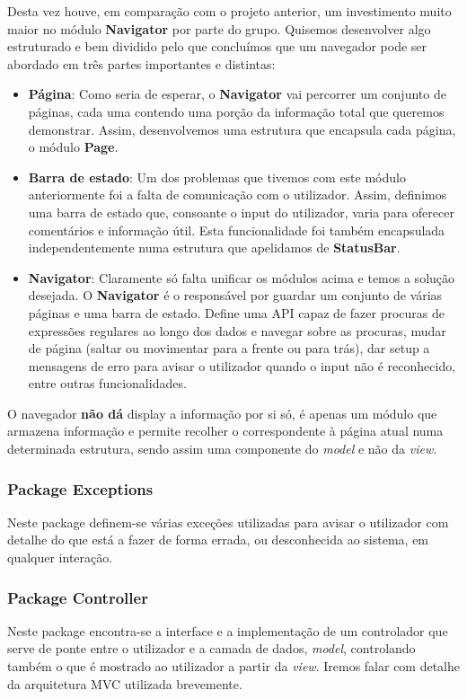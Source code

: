 \documentclass[11pt]{article}
\begin{document}
Desta vez houve, em comparação com o projeto anterior, um investimento muito maior no módulo \textbf{Navigator} por parte do grupo. Quisemos desenvolver algo estruturado e bem dividido pelo que concluímos que um navegador pode ser abordado em três partes importantes e distintas:

\begin{itemize}
    \item \textbf{Página}: Como seria de esperar, o \textbf{Navigator} vai percorrer um conjunto de páginas, cada uma contendo uma porção da informação total que queremos demonstrar. Assim, desenvolvemos uma estrutura que encapsula cada página, o módulo \textbf{Page}.
    \item \textbf{Barra de estado}: Um dos problemas que tivemos com este módulo anteriormente foi a falta de comunicação com o utilizador. Assim, definimos uma barra de estado que, consoante o input do utilizador, varia para oferecer comentários e informação útil. Esta funcionalidade foi também encapsulada independentemente numa estrutura que apelidamos de \textbf{StatusBar}.
    \item \textbf{Navigator}: Claramente só falta unificar os módulos acima e temos a solução desejada. O \textbf{Navigator} é o responsável por guardar um conjunto de várias páginas e uma barra de estado. Define uma API capaz de fazer procuras de expressões regulares ao longo dos dados e navegar sobre as procuras, mudar de página (saltar ou movimentar para a frente ou para trás), dar setup a mensagens de erro para avisar o utilizador quando o input não é reconhecido, entre outras funcionalidades.
\end{itemize}

O navegador \textbf{não dá} display a informação por si só, é apenas um módulo que armazena informação e permite recolher o correspondente à página atual numa determinada estrutura, sendo assim uma componente do \textit{model} e não da \textit{view}.


\newpage
\subsubsection{Package Exceptions}
Neste package definem-se várias exceções utilizadas para avisar o utilizador com detalhe do que está a fazer de forma errada, ou desconhecida ao sistema, em qualquer interação.

\subsubsection{Package Controller}
Neste package encontra-se a interface e a implementação de um controlador que serve de ponte entre o utilizador e a camada de dados, \textit{model}, controlando também o que é mostrado ao utilizador a partir da \textit{view}. Iremos falar com detalhe da arquitetura MVC utilizada brevemente.
\end{document}
